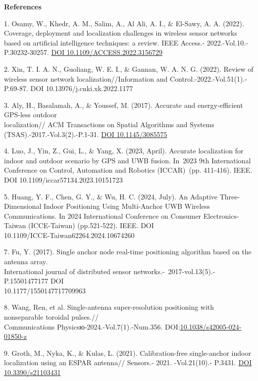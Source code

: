 \begin{center}
{\bfseries References}
\end{center}

\begin{references}
1. Osamy, W., Khedr, A. M., Salim, A., Al Ali, A. I., \& El-Sawy, A. A.
(2022). Coverage, deployment and localization challenges in wireless
sensor networks based on artificial intelligence techniques: a review.
IEEE Access.- 2022.-Vol.10.-P.30232-30257.
\href{https://doi.org/10.1109/ACCESS.2022.3156729}{DOI
10.1109/ACCESS.2022.3156729}

2. Xin, T. I. A. N., Guoliang, W. E. I., \& Gannan, W. A. N. G. (2022).
Review of wireless sensor network localization//Information and
Control.-2022.-Vol.51(1).-P.69-87.
DOI 10.13976/j.cnki.xk.2022.1177

3. Aly, H., Basalamah, A., \& Youssef, M. (2017). Accurate and
energy-efficient GPS-less outdoor \\localization// ACM Transactions on
Spatial Algorithms and Systems (TSAS).-2017.-Vol.3(2).-P.1-31.
\href{https://doi.org/10.1145/3085575}{DOI 10.1145/3085575}

4. Luo, J., Yin, Z., Gui, L., \& Yang, X. (2023, April). Accurate
localization for indoor and outdoor scenario by GPS and UWB
fusion. In 2023 9th International Conference on Control, Automation
and Robotics (ICCAR) (pp. 411-416). IEEE. DOI
10.1109/iccar57134.2023.10151723

5. Huang, Y. F., Chen, G. Y., \& Wu, H. C. (2024, July). An
Adaptive Three-Dimensional Indoor Positioning Using Multi-Anchor UWB
Wireless Communications. In 2024 International Conference on Consumer
Electronics-Taiwan (ICCE-Taiwan) (pp.521-522). IEEE.
DOI \\10.1109/ICCE-Taiwan62264.2024.10674260

7. Fu, Y. (2017). Single anchor node real-time positioning algorithm
based on the antenna array. \\International journal of distributed sensor
networks.-~2017-vol.13(5).-P.15501477177
DOI \\10.1177/1550147717709963

8. Wang, Ren, et al. Single-antenna super-resolution positioning with
nonseparable toroidal pulses.// \\Communications
Physicsю-2024.-Vol.7(1).-Num.356.
DOI:\href{http://dx.doi.org/10.1038/s42005-024-01850-z}{10.1038/s42005-024-01850-z}

9. Groth, M., Nyka, K., \& Kulas, L. (2021). Calibration-free
single-anchor indoor localization using an ESPAR antenna// Sensors.-
2021. -Vol.21(10).- P.3431. \href{https://doi.org/10.3390/s21103431}{DOI
10.3390/s21103431}


\end{references}

